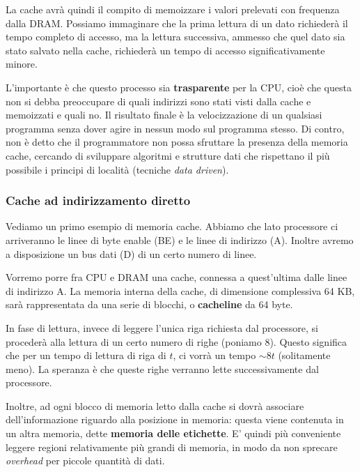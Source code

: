 \documentclass[a4paper,11pt]{article}
\begin{document}
\par\smallskip

La cache avrà quindi il compito di memoizzare i valori prelevati con frequenza dalla DRAM.
Possiamo immaginare che la prima lettura di un dato richiederà il tempo completo di accesso, ma la lettura successiva, ammesso che quel dato sia stato salvato nella cache, richiederà un tempo di accesso significativamente minore.

L'importante è che questo processo sia \textbf{trasparente} per la CPU, cioè che questa non si debba preoccupare di quali indirizzi sono stati visti dalla cache e memoizzati e quali no.
Il risultato finale è la velocizzazione di un qualsiasi programma senza dover agire in nessun modo sul programma stesso.
Di contro, non è detto che il programmatore non possa sfruttare la presenza della memoria cache, cercando di sviluppare algoritmi e strutture dati che rispettano il più possibile i principi di località (tecniche \textit{data driven}).

\subsubsection{Cache ad indirizzamento diretto}
Vediamo un primo esempio di memoria cache.
Abbiamo che lato processore ci arriveranno le linee di byte enable (BE) e le linee di indirizzo (A).
Inoltre avremo a disposizione un bus dati (D) di un certo numero di linee.

Vorremo porre fra CPU e DRAM una cache, connessa a quest'ultima dalle linee di indirizzo A.
La memoria interna della cache, di dimensione complessiva 64 KB, sarà rappresentata da una serie di blocchi, o \textbf{cacheline} da 64 byte.

In fase di lettura, invece di leggere l'unica riga richiesta dal processore, si procederà alla lettura di un certo numero di righe (poniamo 8).
Questo significa che per un tempo di lettura di riga di $t$, ci vorrà un tempo $\sim 8t$ (solitamente meno).
La speranza è che queste righe verranno lette successivamente dal processore.

Inoltre, ad ogni blocco di memoria letto dalla cache si dovrà associare dell'informazione riguardo alla posizione in memoria: questa viene contenuta in un altra memoria, dette \textbf{memoria delle etichette}.
E' quindi più conveniente leggere regioni relativamente più grandi di memoria, in modo da non sprecare \textit{overhead} per piccole quantità di dati.
\end{document}
